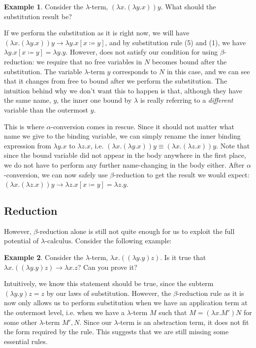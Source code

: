 \documentclass[a4paper,11pt]{article}
\theoremstyle{definition}
\theoremstyle{example}
\newtheorem*{example}{Example}
\theoremstyle{lemma}
\newcommand{\lcalc}{\lambda\text{-calculus}}
\newcommand{\lamterm}[2]{\lambda #1. #2}
\newcommand{\subs}[3]{#1[#2\coloneqq#3]}
\newcommand{\redto}{\longrightarrow}
\begin{document}
\begin{example}
Consider the $\lambda$-term, $(\lamterm{x}{(\lamterm{y}{x})})y$. What should the substitution result be?
\end{example}

If we perform the substitution as it is right now, we will have $(\lamterm{x}{(\lamterm{y}{x})})y \redto \subs{\lamterm{y}{x}}{x}{y}$, and by substitution rule (5) and (1), we have $\subs{\lamterm{y}{x}}{x}{y} = \lamterm{y}{y}$. However, does not satisfy our condition for using $\beta$-reduction: we require that no free variables in $N$ becomes bound after the substitution. The variable $\lambda$-term $y$ corresponds to $N$ in this case, and we can see that it changes from free to bound after we perform the substitution. The intuition behind why we don't want this to happen is that, although they have the same name, $y$, the inner one bound by $\lambda$ is really referring to a \textit{different} variable than the outermost $y$.

This is where $\alpha$-conversion comes in rescue. Since it should not matter what name we give to the binding variable, we can simply rename the inner binding expression from $\lamterm{y}{x}$ to $\lamterm{z}{x}$, i.e. $(\lamterm{x}{(\lamterm{y}{x})})y \equiv (\lamterm{x}{(\lamterm{z}{x})})y$. Note that since the bound variable did not appear in the body anywhere in the first place, we do not have to perform any further name-changing in the body either. After $\alpha$-conversion, we can now safely use $\beta$-reduction to get the result we would expect: $(\lamterm{x}{(\lamterm{z}{x})})y \redto \subs{\lamterm{z}{x}}{x}{y} = \lamterm{z}{y}$.
\subsection{Reduction}

However, $\beta$-reduction alone is still not quite enough for us to exploit the full potential of $\lcalc$. Consider the following example:

\begin{example}
Consider the $\lambda$-term, $\lamterm{x}{((\lamterm{y}{y})z)}$. Is it true that $\lamterm{x}{((\lamterm{y}{y})z)} \redto \lamterm{x}{z}$? Can you prove it?
\end{example}
Intuitively, we know this statement should be true, since the subterm $(\lamterm{y}{y})z = z$ by our laws of substitution. However, the $\beta$-reduction rule as it is now only allows us to perform substitution when we have an application term at the outermost level, i.e. when we have a $\lambda$-term $M$ such that $M = (\lamterm{x}{M'})N$ for some other $\lambda$-term $M', N$. Since our $\lambda$-term is an abstraction term, it does not fit the form required by the rule. This suggests that we are still missing some essential rules.
\end{document}
